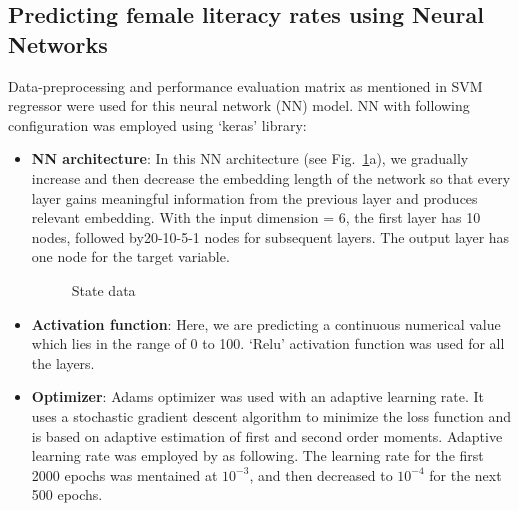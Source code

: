 \documentclass{article}
\begin{document}
\subsection{Predicting female literacy rates using Neural Networks}
Data-preprocessing and performance evaluation matrix as mentioned in SVM regressor were used for this neural network (NN) model. NN with following configuration was employed using `keras' library:
\begin{itemize}
	\item \textbf{NN architecture}: In this NN architecture (see Fig.~\ref{fig_NN}a), we gradually increase and then decrease the embedding length of the network so that every layer gains meaningful information from the previous layer and produces relevant embedding. With the input dimension = 6, the first layer has 10 nodes, followed by20-10-5-1 nodes for subsequent layers. The output layer has one node for the target variable. 
	\begin{figure}[h]
		\centering
		\caption{State data}
		\label{fig_NN}
	\end{figure}	
	\item \textbf{Activation function}:  Here, we are predicting a continuous numerical value which lies in the range of 0 to 100. `Relu' activation function was used for all the layers. 
	\item \textbf{Optimizer}:  Adams optimizer was used with an adaptive learning rate. It uses a stochastic gradient descent algorithm to minimize the loss function and is based on adaptive estimation of first and second order moments. Adaptive learning rate was employed by as following. The learning rate for the first 2000 epochs was mentained at   $10^{-3}$, and then decreased to $10^{-4}$ for the next 500 epochs. 

\end{itemize}
\end{document}
